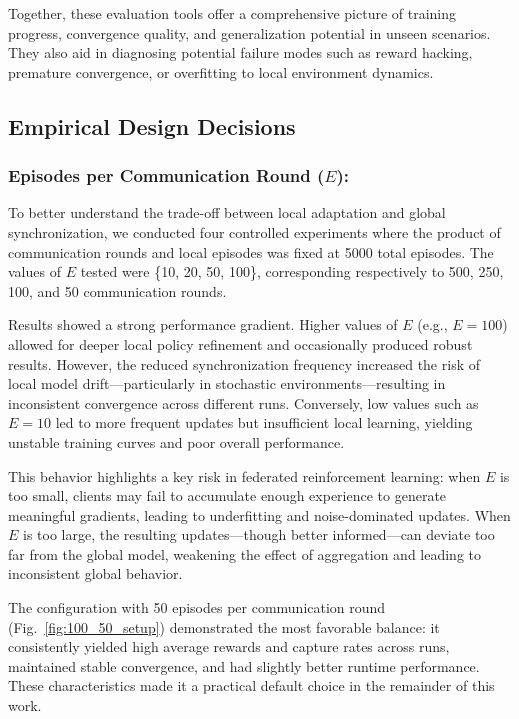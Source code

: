 \documentclass[12pt,a4paper,twoside,openany]{book}
\begin{document}
Together, these evaluation tools offer a comprehensive picture of training progress, convergence quality, and generalization potential in unseen scenarios. They also aid in diagnosing potential failure modes such as reward hacking, premature convergence, or overfitting to local environment dynamics.

\subsection{Empirical Design Decisions} \label{subsec:empirical_design}

\subsubsection{Episodes per Communication Round ($E$):}
To better understand the trade-off between local adaptation and global synchronization, we conducted four controlled experiments where the product of communication rounds and local episodes was fixed at 5000 total episodes. The values of $E$ tested were \{10, 20, 50, 100\}, corresponding respectively to 500, 250, 100, and 50 communication rounds.

Results showed a strong performance gradient. Higher values of $E$ (e.g., $E=100$) allowed for deeper local policy refinement and occasionally produced robust results. However, the reduced synchronization frequency increased the risk of local model drift—particularly in stochastic environments—resulting in inconsistent convergence across different runs. Conversely, low values such as $E=10$ led to more frequent updates but insufficient local learning, yielding unstable training curves and poor overall performance.

This behavior highlights a key risk in federated reinforcement learning: when $E$ is too small, clients may fail to accumulate enough experience to generate meaningful gradients, leading to underfitting and noise-dominated updates. When $E$ is too large, the resulting updates—though better informed—can deviate too far from the global model, weakening the effect of aggregation and leading to inconsistent global behavior.

The configuration with 50 episodes per communication round (Fig.~\ref{fig:100_50_setup}) demonstrated the most favorable balance: it consistently yielded high average rewards and capture rates across runs, maintained stable convergence, and had slightly better runtime performance. These characteristics made it a practical default choice in the remainder of this work.
\end{document}
